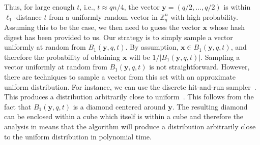 \documentclass[pdflatex,sn-mathphys-num]{sn-jnl}
\theoremstyle{definition}
\newcommand{\vtr}[1]{\mathbf{#1}}
\begin{document}
Thus, for large enough $t$, i.e., $t \approx qn/4$, the vector $\vtr{y} = (q/2, \ldots, q/2)$ is within $\ell_1$-distance $t$ from a uniformly random vector in $\mathbb{Z}_q^n$ with high probability. Assuming this to be the case, we then need to guess the vector $\vtr{x}$ whose hash digest has been provided to us. Our strategy is to simply sample a vector uniformly at random from $B_1(\vtr{y}, q, t)$. By assumption, $\vtr{x} \in B_1(\vtr{y}, q, t)$, and therefore the probability of obtaining $\vtr{x}$ will be $1/|B_1(\vtr{y}, q, t)|$. Sampling a vector uniformly at random from $B_1(\vtr{y}, q, t)$ is not straightforward. However, there are techniques to sample a vector from this set with an approximate uniform distribution. For instance, we can use the discrete hit-and-run sampler~\cite{baumert2009dhr}. This produces a distribution arbitrarily close to uniform~\cite[\S 11.2]{mitzenmacher2017probability}. This follows from the fact that $B_1(\vtr{y}, q, t)$ is a diamond centered around $\vtr{y}$. The resulting diamond can be enclosed within a cube which itself is within a cube and therefore the analysis in \cite[\S 4.2]{baumert2009dhr} means that the algorithm will produce a distribution arbitrarily close to the uniform distribution in polynomial time.  
\end{document}

